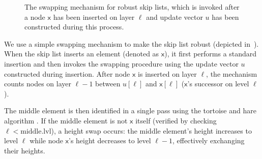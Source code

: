 \begin{figure}[h]
    \centering
    \begin{pchstack}[boxed,center,space=0.5em]
    \end{pchstack}
  \caption[Skip List Swapping Mechanism.]{The swapping mechanism for robust skip lists, which is invoked after a node $\mathsf{x}$  has been inserted on layer $\ell$ and update vector $u$ has been constructed during this process. 
  } 
  \label{fig:swap}
\end{figure}

We use a simple swapping mechanism to make the skip list robust (depicted in~). When the skip list inserts an element (denoted as $\mathsf{x}$), it first performs a standard insertion and then invokes the swapping procedure using the update vector $u$ constructed during insertion. After node $\mathsf{x}$ is inserted on layer $\ell$, the mechanism counts nodes on layer $\ell-1$ between $u[\ell]$ and $\mathsf{x}[\ell]$ ($\mathsf{x}$'s successor on level $\ell$). 

The middle element is then identified in a single pass using the tortoise and hare algorithm \cite{knuth1971art}. If the middle element is not $\mathsf{x}$ itself (verified by checking $\ell < \text{middle.lvl}$), a height swap occurs: the middle element's height increases to level $\ell$ while node $\mathsf{x}$'s height decreases to level $\ell-1$, effectively exchanging their heights.

